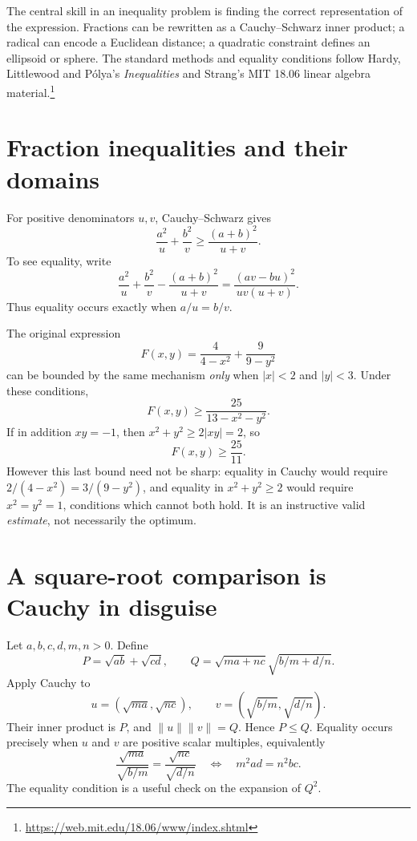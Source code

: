 
The central skill in an inequality problem is finding the correct representation of the expression. Fractions can be rewritten as a Cauchy--Schwarz inner product; a radical can encode a Euclidean distance; a quadratic constraint defines an ellipsoid or sphere. The standard methods and equality conditions follow Hardy, Littlewood and Pólya's \emph{Inequalities} and Strang's MIT 18.06 linear algebra material.\footnote{\url{https://web.mit.edu/18.06/www/index.shtml}}

\section{Fraction inequalities and their domains}

For positive denominators \(u,v\), Cauchy--Schwarz gives
\[
 \frac{a^2}{u}+\frac{b^2}{v}
 \ge\frac{(a+b)^2}{u+v}.
\]
To see equality, write
\[
 \frac{a^2}{u}+\frac{b^2}{v}-\frac{(a+b)^2}{u+v}
 =\frac{(av-bu)^2}{uv(u+v)}.
\]
Thus equality occurs exactly when \(a/u=b/v\).

The original expression
\[
 F(x,y)=\frac4{4-x^2}+\frac9{9-y^2}
\]
can be bounded by the same mechanism \emph{only} when \(|x|<2\) and \(|y|<3\). Under these conditions,
\[
 F(x,y)\ge\frac{25}{13-x^2-y^2}.
\]
If in addition \(xy=-1\), then \(x^2+y^2\ge2|xy|=2\), so
\[
 \boxed{F(x,y)\ge\frac{25}{11}.}
\]
However this last bound need not be sharp: equality in Cauchy would require \(2/(4-x^2)=3/(9-y^2)\), and equality in \(x^2+y^2\ge2\) would require \(x^2=y^2=1\), conditions which cannot both hold. It is an instructive valid \emph{estimate}, not necessarily the optimum.

\section{A square-root comparison is Cauchy in disguise}

Let \(a,b,c,d,m,n>0\). Define
\[
 P=\sqrt{ab}+\sqrt{cd},\qquad
 Q=\sqrt{ma+nc}\sqrt{b/m+d/n}.
\]
Apply Cauchy to
\[
 u=(\sqrt{ma},\sqrt{nc}),\qquad
 v=(\sqrt{b/m},\sqrt{d/n}).
\]
Their inner product is \(P\), and \(\|u\|\|v\|=Q\). Hence \(P\le Q\). Equality occurs precisely when \(u\) and \(v\) are positive scalar multiples, equivalently
\[
 \frac{\sqrt{ma}}{\sqrt{b/m}}
 =\frac{\sqrt{nc}}{\sqrt{d/n}}
 \quad\Longleftrightarrow\quad
 \boxed{m^2ad=n^2bc}.
\]
The equality condition is a useful check on the expansion of \(Q^2\).

